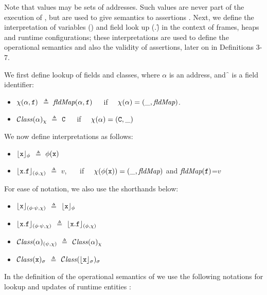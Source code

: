 Note that values may be sets of addresses. Such values are never part of the execution of 
\LangOO, but are used to give semantics to assertions . %
Next, we define the interpretation of variables (\x) and   field look up  (\x.\f)
in the context of frames,
heaps and runtime configurations; these interpretations are used to define the operational semantics and  also  the
validity of assertions, later on in Definitions 3-7. %

\begin{definition}[Interpretations]
\label{def:interp}
We first define lookup of fields and classes, where $\alpha$ is an address, and \f\, is a field identifier:
\begin{itemize}
\item
$\chi ({\alpha},{{\mbox{\tt{f}}}})$ $\triangleq$  $\textit{fldMap}({\alpha},{{\mbox{\tt{f}}}})$\ \ \ if \ \ $\chi(\alpha)=(\_, \textit{fldMap})$.
\item
${\mathcal C}{\mathit{lass}}(\alpha)_{\chi} $ $\triangleq$ ${\mbox{\tt{C}}}$\  \ \ if \ \ $\chi(\alpha)=({\mbox{\tt{C}}},\_)$
\end{itemize}

\noindent
We now define interpretations  as follows:

\begin{itemize}
\item
${\lfloor{ {{\mbox{\tt{x}}}}}\rfloor_{\phi}} $ $\triangleq$ $\phi({\mbox{\tt{x}}})$
\item
${\lfloor{ {{\mbox{\tt{x}}}.{\mbox{\tt{f}}}}}\rfloor_{(\phi,\chi)}} $ $\triangleq$ $v$, \ \ \ if \ \ $\chi(\phi({\mbox{\tt{x}}}))=(\_, \textit{fldMap})$ and $\textit{fldMap}({\mbox{\tt{f}}})$=$v$

\end{itemize}

\noindent
For ease of notation, we also use the shorthands below:
\begin{itemize}
\item
${\lfloor{ {{\mbox{\tt{x}}}}}\rfloor_{(\phi\cdot\psi,\chi)}} $ $\triangleq$ ${\lfloor{ {{\mbox{\tt{x}}}}}\rfloor_{\phi}} $
\item
${\lfloor{ {{\mbox{\tt{x}}}.{\mbox{\tt{f}}}}}\rfloor_{(\phi\cdot\psi,\chi)}} $ $\triangleq$ ${\lfloor{ {{\mbox{\tt{x}}}.{\mbox{\tt{f}}}}}\rfloor_{(\phi,\chi)}} $
\item
${\mathcal C}{\mathit{lass}}(\alpha)_{(\psi,\chi)} $ $\triangleq$ ${\mathcal C}{\mathit{lass}}(\alpha)_{\chi} $
\item
${\mathcal C}{\mathit{lass}}({\mbox{\tt{x}}})_{\sigma} $ $\triangleq$ ${\mathcal C}{\mathit{lass}}({\lfloor{ {{\mbox{\tt{x}}}}}\rfloor_{\sigma}})_{\sigma} $
\end{itemize}

\end{definition}

In the definition of the operational semantics of \LangOO we use the following notations for lookup and updates of runtime entities :

